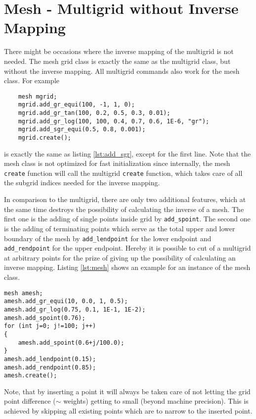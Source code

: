 \chapter{Mesh - Multigrid without Inverse Mapping}
There might be occasions where the inverse mapping of the multigrid is not needed. The mesh grid class is exactly the same as the multigrid class, but without the inverse mapping. All multigrid commands also work for the mesh class. For example 
\begin{lstlisting}
	mesh mgrid;
	mgrid.add_gr_equi(100, -1, 1, 0);
	mgrid.add_gr_tan(100, 0.2, 0.5, 0.3, 0.01);
	mgrid.add_gr_log(100, 100, 0.4, 0.7, 0.6, 1E-6, "gr");
	mgrid.add_sgr_equi(0.5, 0.8, 0.001);
	mgrid.create();
\end{lstlisting}
is exactly the same as listing \ref{lst:add_sgr}, except for the first line. Note that the mesh class is not optimized for fast initialization since internally, the mesh \texttt{create} function will call the multigrid \texttt{create} function, which takes care of all the subgrid indices needed for the inverse mapping.

In comparison to the multigrid, there are only two additional features, which at the same time destroys the possibility of calculating the inverse of a mesh. The first one is the adding of single points inside grid by
\texttt{add\_spoint}. The second one is the adding of terminating points which serve as the total upper and lower boundary of the mesh by \texttt{add\_lendpoint} for the lower endpoint and \texttt{add\_rendpoint} for the upper endpoint. Hereby it is possible to cut of a multigrid at arbitrary points for the prize of giving up the possibility of calculating an inverse mapping. Listing \ref{lst:mesh} shows an example for an instance of the mesh class.
\begin{lstlisting}[caption={Example of a mesh},label={lst:mesh}]
mesh amesh;
amesh.add_gr_equi(10, 0.0, 1, 0.5);
amesh.add_gr_log(0.75, 0.1, 1E-1, 1E-2);
amesh.add_spoint(0.76);
for (int j=0; j!=100; j++)
{
	amesh.add_spoint(0.6+j/100.0);
}
amesh.add_lendpoint(0.15);
amesh.add_rendpoint(0.85);
amesh.create();
\end{lstlisting}
Note, that by inserting a point it will always be taken care of not letting the grid point difference ($\sim$ weights) getting to small (beyond machine precision). This is achieved by skipping all existing points which are to narrow to the inserted point.